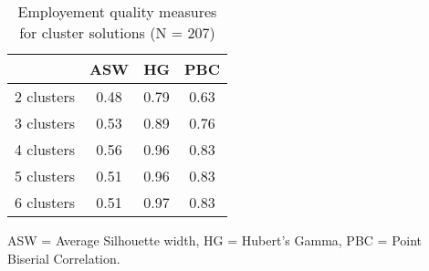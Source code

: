 \begin{table}[htp]
\footnotesize
\setlength{\tabcolsep}{35pt}
\renewcommand{\arraystretch}{1.3}
\begin{threeparttable}
\centering
\caption{Employement quality measures for cluster solutions (N = 207)} 
\label{tab:quality_clusters_job}
\begin{tabular}{lccc}
  \hline
 & ASW & HG & PBC \\ 
  \hline
2 clusters & 0.48 & 0.79 & 0.63 \\ 
  3 clusters & 0.53 & 0.89 & 0.76 \\ 
  4 clusters & 0.56 & 0.96 & 0.83 \\ 
  5 clusters & 0.51 & 0.96 & 0.83 \\ 
  6 clusters & 0.51 & 0.97 & 0.83 \\ 
   \hline
\end{tabular}
\begin{tablenotes}
\scriptsize
\item ASW = Average Silhouette width, HG = Hubert's Gamma, PBC = Point Biserial Correlation.
\end{tablenotes}
\end{threeparttable}
\end{table}
